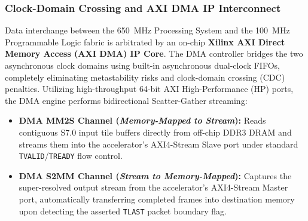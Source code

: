 \documentclass[conference]{IEEEtran}
\begin{document}
\subsubsection{Clock-Domain Crossing and AXI DMA IP Interconnect}
Data interchange between the 650~MHz Processing System and the 100~MHz Programmable Logic fabric is arbitrated by an on-chip \textbf{Xilinx AXI Direct Memory Access (AXI DMA) IP Core}. The DMA controller bridges the two asynchronous clock domains using built-in asynchronous dual-clock FIFOs, completely eliminating metastability risks and clock-domain crossing (CDC) penalties. Utilizing high-throughput 64-bit AXI High-Performance (HP) ports, the DMA engine performs bidirectional Scatter-Gather streaming:
\begin{itemize}
    \item \textbf{DMA MM2S Channel (\textit{Memory-Mapped to Stream}):} Reads contiguous S7.0 input tile buffers directly from off-chip DDR3 DRAM and streams them into the accelerator's AXI4-Stream Slave port under standard \texttt{TVALID}/\texttt{TREADY} flow control.
    \item \textbf{DMA S2MM Channel (\textit{Stream to Memory-Mapped}):} Captures the super-resolved output stream from the accelerator's AXI4-Stream Master port, automatically transferring completed frames into destination memory upon detecting the asserted \texttt{TLAST} packet boundary flag.
\end{itemize}
\end{document}
